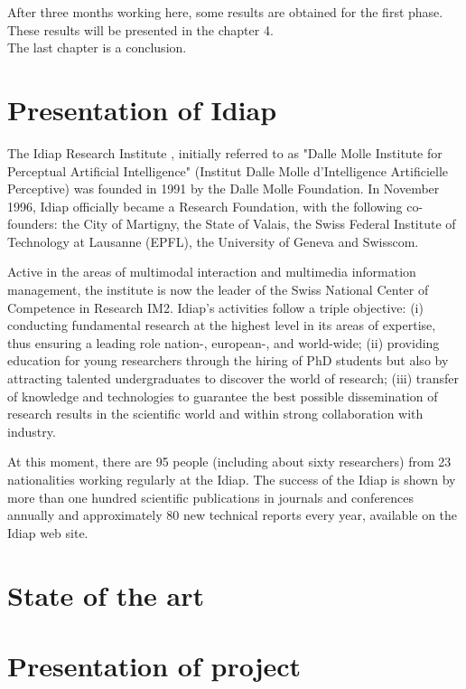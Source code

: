 \documentclass[12pt, a4paper]{report}
\begin{document}
After three months working here, some results are obtained for the first phase. These results will be presented in the chapter 4. \\

The last chapter is a conclusion.

\newpage
\chapter{Presentation of Idiap} 
 
The Idiap Research Institute \cite{6}, initially referred to as "Dalle Molle Institute for Perceptual Artificial Intelligence" (Institut Dalle Molle d'Intelligence Artificielle Perceptive) was founded in 1991 by the Dalle Molle Foundation. In November 1996, Idiap officially became a Research Foundation, with the following co-founders: the City of Martigny, the State of Valais, the Swiss Federal Institute of Technology at Lausanne (EPFL), the University of Geneva and Swisscom.

Active in the areas of multimodal interaction and multimedia information management, the institute is now the leader of the Swiss National Center of Competence in Research IM2. Idiap's activities follow a triple objective: (i) conducting fundamental research at the highest level in its areas of expertise, thus ensuring a leading role nation-, european-, and world-wide; (ii) providing education for young researchers through the hiring of PhD students but also by attracting talented undergraduates to discover the world of research; (iii) transfer of knowledge and technologies to guarantee the best possible dissemination of research results in the scientific world and within strong collaboration with industry.

At this moment, there are 95 people (including about sixty researchers) from 23 nationalities working regularly at the Idiap. The success of the Idiap is shown by more than one hundred scientific publications in journals and conferences annually and approximately 80 new technical reports every year, available on the Idiap web site.

\newpage
\chapter{State of the art}

\newpage

\chapter{Presentation of project} 
\end{document}
